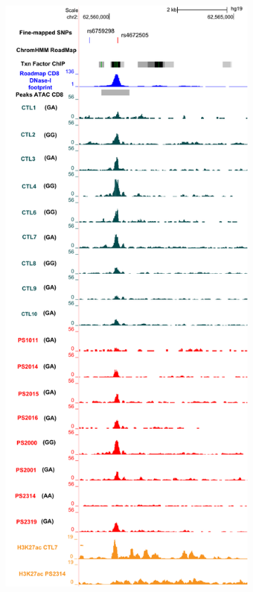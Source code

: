 \begin{figure}[htbp]
\begin{subfigure}{0.5\textwidth}
\includegraphics[width=\textwidth]{./Results2/pdfs/chr2p15_rs4672505_FM_CD8_track_all_marks}

\end{subfigure}
\end{figure}
